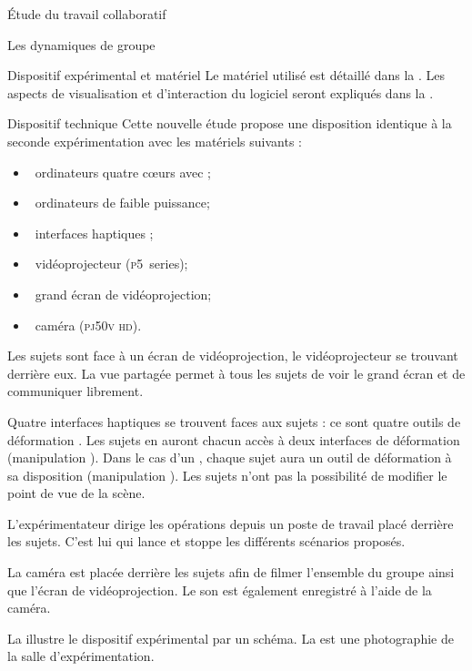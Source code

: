 \documentclass[myfrancais]{mythesis}
\begin{document}
\begin{mypart}{Étude du travail collaboratif}
\begin{mychapter}{Les dynamiques de groupe}
\begin{mysection}{Dispositif expérimental et matériel}
				Le matériel utilisé est détaillé dans la .
				Les aspects de visualisation et d'interaction du logiciel seront expliqués dans la .
				\begin{mysubsection}{Dispositif technique}
					Cette nouvelle étude propose une disposition identique à la seconde expérimentation  avec les matériels suivants :
					\begin{itemize}
						\item {}~ordinateurs quatre cœurs \myIntelCore avec ;
						\item {}~ordinateurs de faible puissance;
						\item {}~interfaces haptiques \myOmni;
						\item {}~vidéoprojecteur \myACER (\textsc{p5}~series);
						\item {}~grand écran de vidéoprojection;
						\item {}~caméra \mySony (\textsc{pj50v hd}).
					\end{itemize}

					Les sujets sont face à un écran de vidéoprojection, le vidéoprojecteur se trouvant derrière eux.
					La vue partagée permet à tous les sujets de voir le grand écran et de communiquer librement.

					Quatre interfaces haptiques se trouvent faces aux sujets : ce sont quatre outils de déformation  .
					Les sujets en  auront chacun accès à deux interfaces de déformation (manipulation ).
					Dans le cas d'un , chaque sujet aura un outil de déformation à sa disposition (manipulation ).
					Les sujets n'ont pas la possibilité de modifier le point de vue de la scène.

					L'expérimentateur dirige les opérations depuis un poste de travail placé derrière les sujets.
					C'est lui qui lance et stoppe les différents scénarios proposés.

					La caméra est placée derrière les sujets afin de filmer l'ensemble du groupe ainsi que l'écran de vidéoprojection.
					Le son est également enregistré à l'aide de la caméra.

					La  illustre le dispositif expérimental par un schéma.
					La  est une photographie de la salle d'expérimentation.


\end{mysubsection}
\end{mysection}
\end{mychapter}
\end{mypart}
\end{document}

